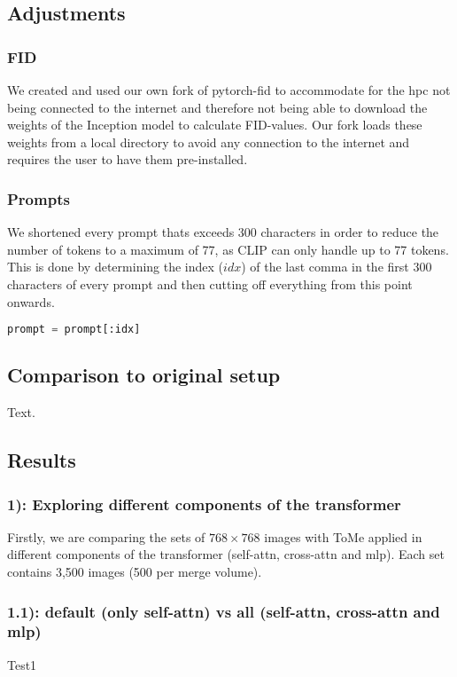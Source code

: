 \subsection{Adjustments}
\subsubsection*{FID}
We created and used our own fork of pytorch-fid\cite{Seitzer2020FID} to accommodate for the hpc not being connected to the internet and therefore not being able to download the weights of the Inception model to calculate FID-values. Our fork loads these weights from a local directory to avoid any connection to the internet and requires the user to have them pre-installed.

\subsubsection*{Prompts}
We shortened every prompt thats exceeds 300 characters in order to reduce the number of tokens to a maximum of 77, as CLIP\cite{radford2021learning} can only handle up to 77 tokens.\\
This is done by determining the index (\(idx\)) of the last comma in the first 300 characters of every prompt and then cutting off everything from this point onwards.
\begin{lstlisting}[language=Python]
prompt = prompt[:idx]
\end{lstlisting}

\subsection{Comparison to original setup}
Text.

\subsection{Results}
\subsubsection*{1): Exploring different components of the transformer}
Firstly, we are comparing the sets of $768 \times 768$ images with ToMe applied in different components of the transformer (self-attn, cross-attn and mlp). Each set contains 3,500 images (500 per merge volume).

\newpage
\subsubsection*{1.1): default (only self-attn) vs all (self-attn, cross-attn and mlp)}
%   
%   

Test1

